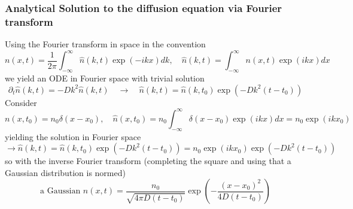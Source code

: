 \subsubsection{Analytical Solution to the diffusion equation via Fourier transform}
Using the Fourier transform in space in the convention
\begin{equation}
    n(x, t)=\frac{1}{2 \pi} \int_{-\infty}^{\infty} \hat{n}(k, t) \exp (-i k x) d k, \quad \hat{n}(k, t)=\int_{-\infty}^{\infty} n(x, t) \exp (i k x) d x
\end{equation}
we yield an ODE in Fourier space with trivial solution
\begin{equation}
    \partial_t \hat{n}(k, t)=-D k^2 \hat{n}(k, t) \quad \rightarrow \quad \hat{n}(k, t)=\hat{n}\left(k, t_0\right) \exp \left(-D k^2\left(t-t_0\right)\right)
\end{equation}
Consider
\begin{equation}
    n\left(x, t_0\right)=n_0 \delta\left(x-x_0\right), \quad \hat{n}\left(x, t_0\right)=n_0 \int_{-\infty}^{\infty} \delta\left(x-x_0\right) \exp (i k x) d x=n_0 \exp \left(i k x_0\right)
\end{equation}
yielding the solution in Fourier space
\begin{equation}
    \rightarrow \hat{n}(k, t)=\hat{n}\left(k, t_0\right) \exp \left(-D k^2\left(t-t_0\right)\right)=n_0 \exp \left(i k x_0\right) \exp \left(-D k^2\left(t-t_0\right)\right)
\end{equation}
so with the inverse Fourier transform (completing the square and using that a Gaussian distribution is normed)
\begin{equation}
    \text{a Gaussian } n(x, t)=\frac{n_0}{\sqrt{4 \pi D\left(t-t_0\right)}} \exp \left(-\frac{\left(x-x_0\right)^2}{4 D\left(t-t_0\right)}\right)
\end{equation}

